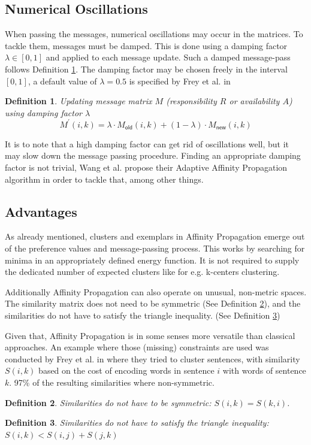 \documentclass[11pt,a4paper]{article}
\newtheorem{definition}{Definition}
\begin{document}
\subsection{Numerical Oscillations}
When passing the messages, numerical oscillations may occur in the matrices. To tackle them, messages must be damped. This is done using a damping factor $\lambda \in \left[0,1\right]$ and applied to each message update. Such a damped message-pass follows Definition \ref{def:dampupdate}. The damping factor may be chosen freely in the interval $[0,1]$, a default value of $\lambda = 0.5$ is specified by Frey et al. in \cite{frey2007clustering}
\begin{definition}\label{def:dampupdate}
	Updating message matrix $M$ (responsibility $R$ or availability $A$) using damping factor $\lambda$
	\[
		M^\prime (i,k) =\lambda \cdot M_{\mathsf{old}}(i,k) + (1-\lambda) \cdot M_{\mathsf{new}} (i,k)
	\]
\end{definition}
It is to note that a high damping factor can get rid of oscillations well, but it may slow down the message passing procedure. \cite{wang2008adaptive} Finding an appropriate damping factor is not trivial, Wang et al. propose their Adaptive Affinity Propagation algorithm in order to tackle that, among other things. \cite{wang2008adaptive}
\subsection{Advantages}
As already mentioned, clusters and exemplars in Affinity Propagation emerge out of the preference values and message-passing process. This works by searching for minima in an appropriately defined energy function. It is not required to supply the dedicated number of expected clusters like for e.g. k-centers clustering.

Additionally Affinity Propagation can also operate on unusual, non-metric spaces. The similarity matrix does not need to be symmetric (See Definition \ref{def:symmetric}), and the similarities do not have to satisfy the triangle inequality. (See Definition \ref{def:triangleieq}) \cite{frey2007clustering}

Given that, Affinity Propagation is in some senses more versatile than classical approaches. An example where those (missing) constraints are used was conducted by Frey et al. in \cite{frey2007clustering} where they tried to cluster sentences, with similarity $S(i,k)$ based on the cost of encoding words in sentence $i$ with words of sentence $k$. 97\% of the resulting similarities where non-symmetric.
\begin{definition}\label{def:symmetric}
	Similarities do not have to be symmetric: $S(i,k) = S(k,i)$.
\end{definition}
\begin{definition}\label{def:triangleieq}
	Similarities do not have to satisfy the triangle inequality: $S(i,k) < S(i,j) + S(j,k)$
\end{definition}
\end{document}
